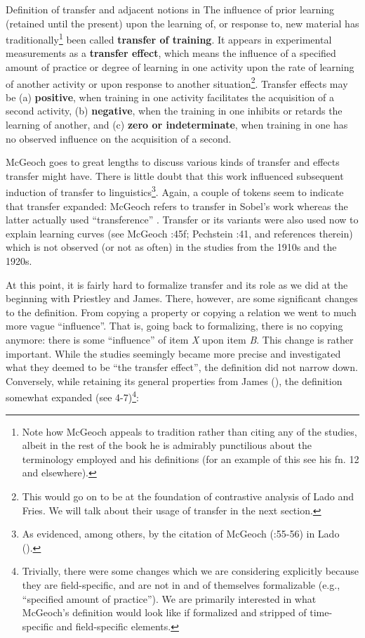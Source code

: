 \documentclass{article}
\begin{document}
\pex Definition of transfer and adjacent notions in \cite{mcgeoch_psychology_1942}
\a The influence of prior learning (retained until the present) upon the learning of, or response to, new material has traditionally\footnote{Note how McGeoch appeals to tradition rather than citing any of the studies, albeit in the rest of the book he is admirably punctilious about the terminology employed and his definitions (for an example of this see his fn. 12 and elsewhere).} been called \textbf{transfer of training}. 
\a It appears in experimental measurements as a \textbf{transfer effect}, which means the influence of a specified amount of practice or degree of learning in one activity upon the rate of learning of another activity or upon response to another situation\footnote{This would go on to be at the foundation of contrastive analysis of Lado and Fries. We will talk about their usage of transfer in the next section.}. 
\a Transfer effects may be (a) \textbf{positive}, when training in one activity facilitates the acquisition of a second activity, (b) \textbf{negative}, when the training in one inhibits or retards the learning of another, and (c) \textbf{zero or indeterminate}, when training in one has no observed influence on the acquisition of a second. \citep[from][p. 394, emphasis added]{mcgeoch_psychology_1942} 
\xe

McGeoch goes to great lengths to discuss various kinds of transfer and effects transfer might have. There is little doubt that this work influenced subsequent induction of transfer to linguistics\footnote{As evidenced, among others, by the citation of McGeoch (\citeyear{mcgeoch_psychology_1942}:55-56) in Lado (\citeyear{lado_relation_1949}).}. Again, a couple of tokens seem to indicate that transfer expanded: McGeoch refers to transfer in Sobel’s work whereas the latter actually used ``transference'' \citep[cf.][p. 386]{sobel_study_1939}. Transfer or its variants were also used now to explain learning curves (see McGeoch \citeyear{mcgeoch_psychology_1942}:45f; Pechstein \citeyear{pechstein_experimental_1939}:41, and references therein) which is not observed (or not as often) in the studies from the 1910s and the 1920s. 

At this point, it is fairly hard to formalize transfer and its role as we did at the beginning with Priestley and James. There, however, are some significant changes to the definition. From copying a property or copying a relation we went to much more vague ``influence''. That is, going back to formalizing, there is no copying anymore: there is some ``influence'' of item \textit{X} upon item \textit{B}. This change is rather important. While the studies seemingly became more precise and investigated what they deemed to be ``the transfer effect'', the definition did not narrow down. Conversely, while retaining its general properties from James (\citeyear{james_principles_1890-1}), the definition somewhat expanded (see 4-7)\footnote{Trivially, there were some changes which we are considering explicitly because they are field-specific, and are not in and of themselves formalizable (e.g., ``specified amount of practice''). We are primarily interested in what McGeoch’s definition would look like if formalized and stripped of time-specific and field-specific elements.}:
\end{document}
